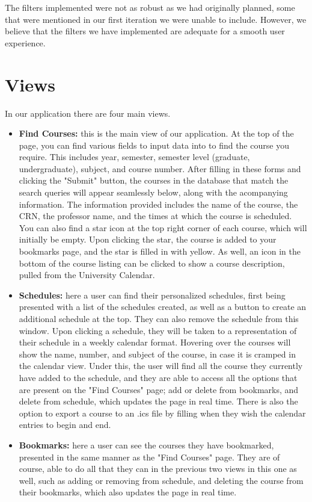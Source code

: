 \documentclass[12pt]{article}
\begin{document}
The filters implemented were not as robust as we had originally planned, some that were mentioned in our first iteration we were unable to include. However, we believe that the filters we have implemented are adequate for a smooth user experience.


\section{Views}

In our application there are four main views.
\begin{itemize}
    \item \textbf{Find Courses:} this is the main view of our application. At the top of the page, you can find various fields to input data into to find the course you require. This includes year, semester, semester level (graduate, undergraduate), subject, and course number. After filling in these forms and clicking the "Submit" button, the courses in the database that match the search queries will appear seamlessly below, along with the acompanying information. The information provided includes the name of the course, the CRN, the professor name, and the times at which the course is scheduled. You can also find a star icon at the top right corner of each course, which will initially be empty. Upon clicking the star, the course is added to your bookmarks page, and the star is filled in with yellow. As well, an icon in the bottom of the course listing can be clicked to show a course description, pulled from the University Calendar.
    \item \textbf{Schedules:} here a user can find their personalized schedules, first being presented with a list of the schedules created, as well as a button to create an additional schedule at the top. They can also remove the schedule from this window. Upon clicking a schedule, they will be taken to a representation of their schedule in a weekly calendar format. Hovering over the courses will show the name, number, and subject of the course, in case it is cramped in the calendar view. Under this, the user will find all the course they currently have added to the schedule, and they are able to access all the options that are present on the "Find Courses" page; add or delete from bookmarks, and delete from schedule, which updates the page in real time.  There is also the option to export a course to an .ics file by filling when they wish the calendar entries to begin and end.
    \item \textbf{Bookmarks:} here a user can see the courses they have bookmarked, presented in the same manner as the "Find Courses" page. They are of course, able to do all that they can in the previous two views in this one as well, such as adding or removing from schedule, and deleting the course from their bookmarks, which also updates the page in real time. 

\end{itemize}
\end{document}
